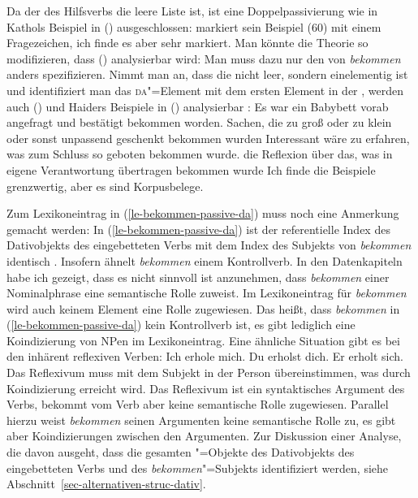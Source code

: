 \noindent
Da der \daw des Hilfsverbs die leere Liste ist, ist eine Doppelpassivierung wie
in Kathols Beispiel in () ausgeschlossen:
\z
\citet{Kathol91a}
markiert sein Beispiel (60) mit einem Fragezeichen, ich finde es aber sehr markiert.
Man könnte die Theorie so modifizieren, dass () analysierbar wird: Man muss dazu nur den \daw
von \emph{bekommen} anders spezifizieren. Nimmt man an, dass die \daliste nicht leer, sondern
einelementig ist und identifiziert man das \textsc{da}"=Element mit dem ersten
Element in der \argstl, werden auch () und Haiders Beispiele in () analysierbar
\citep[4, 8]{Haider2021b}:
\eal
\ex Es war ein Babybett vorab angefragt und bestätigt bekommen worden.
\ex Sachen, die zu groß oder zu klein oder sonst unpassend geschenkt bekommen wurden
\ex Interessant wäre zu erfahren, was zum Schluss so geboten bekommen wurde.
\ex die Reflexion über das, was in eigene Verantwortung übertragen bekommen wurde
\zl
Ich finde die Beispiele grenzwertig, aber es sind Korpusbelege.


Zum Lexikoneintrag in (\ref{le-bekommen-passive-da}) muss noch eine Anmerkung gemacht werden:
In (\ref{le-bekommen-passive-da}) ist der referentielle Index des Dativobjekts des eingebetteten
Verbs mit dem Index des Subjekts von \emph{bekommen} identisch . Insofern
ähnelt \emph{bekommen} einem Kontrollverb. In den Datenkapiteln habe ich gezeigt,
dass es nicht sinnvoll ist anzunehmen, dass \emph{bekommen} einer Nominalphrase eine
semantische Rolle zuweist. Im Lexikoneintrag für \emph{bekommen} wird auch keinem Element eine
Rolle zugewiesen. Das heißt, dass \emph{bekommen} in (\ref{le-bekommen-passive-da}) kein Kontrollverb ist,
es gibt lediglich eine Koindizierung von NPen im Lexikoneintrag. Eine ähnliche Situation gibt
es bei den inhärent reflexiven Verben:
\eal
\ex Ich erhole mich.
\ex Du erholst dich.
\ex Er erholt sich.
\zl
Das Reflexivum muss mit dem Subjekt in der Person übereinstimmen, was durch Koindizierung erreicht wird.
Das Reflexivum ist ein syntaktisches Argument des Verbs, bekommt vom Verb aber keine semantische Rolle zugewiesen.
Parallel hierzu weist \emph{bekommen} seinen Argumenten keine semantische
Rolle zu, es gibt aber Koindizierungen zwischen den Argumenten. Zur Diskussion einer Analyse,
die davon ausgeht, dass die gesamten "=Objekte des Dativobjekts des eingebetteten Verbs
und des \emph{bekommen}"=Subjekts identifiziert werden, siehe Abschnitt~\ref{sec-alternativen-struc-dativ}.


